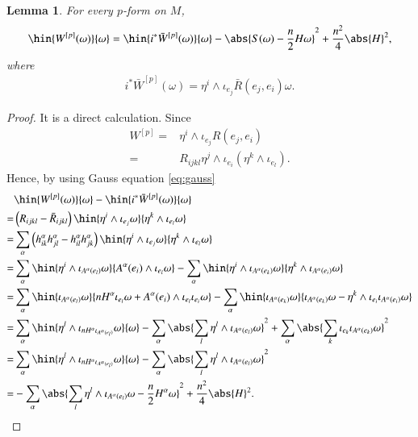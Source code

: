 \documentclass[12pt]{amsart}
\theoremstyle{plain}
\newtheorem{lem}[lem]{Lemma}
\theoremstyle{remark}
\theoremstyle{definition}
\numberwithin{equation}{section}
\begin{document}
\begin{lem}For every $p$-form on $M$,
\begin{align*}
\hin{W^{[p]}(\omega)}{\omega}=\hin{i^*\bar W^{[p]}(\omega)}{\omega}-\abs{S(\omega)-\dfrac{n}{2}H\omega}^2+\dfrac{n^2}{4}\abs{H}^2,
\end{align*}
where
\begin{align*}
i^*\bar W^{[p]}(\omega)=\eta^i\wedge\iota_{e_j}\bar R(e_j,e_i)\omega.
\end{align*}
\end{lem}
\begin{proof}It is a  direct calculation. Since
\begin{align*}
W^{[p]}=&\eta^i\wedge\iota_{e_j}R(e_j,e_i)\\
=&R_{ijkl}\eta^j\wedge\iota_{e_i}\left(\eta^k\wedge\iota_{e_l}\right).
\end{align*}
Hence, by using Gauss equation \eqref{eq:gauss}
\begin{align*}
&\hin{W^{[p]}(\omega)}{\omega}-\hin{i^*\bar W^{[p]}(\omega)}{\omega}\\
=&\left(R_{ijkl}-\bar R_{ijkl}\right)\hin{\eta^i\wedge\iota_{e_j}\omega}{\eta^k\wedge\iota_{e_l}\omega}\\
=&\sum_{\alpha}\left(h^{\alpha}_{ik}h^{\alpha}_{jl}-h^{\alpha}_{il}h^{\alpha}_{jk}\right)\hin{\eta^i\wedge\iota_{e_j}\omega}{\eta^k\wedge\iota_{e_l}\omega}\\
=&\sum_{\alpha}\hin{\eta^i\wedge\iota_{A^{\alpha}(e_l)}\omega}{A^{\alpha}(e_i)\wedge\iota_{e_l}\omega}-\sum_{\alpha}\hin{\eta^i\wedge\iota_{A^{\alpha}(e_k)}\omega}{\eta^k\wedge\iota_{A^{\alpha}(e_i)}\omega}\\
=&\sum_{\alpha}\hin{\iota_{A^{\alpha}(e_l)}\omega}{nH^{\alpha}\iota_{e_l}\omega+A^{\alpha}(e_i)\wedge\iota_{e_l}\iota_{e_i}\omega}-\sum_{\alpha}\hin{\iota_{A^{\alpha}(e_k)}\omega}{\iota_{A^{\alpha}(e_k)}\omega-\eta^k\wedge\iota_{e_i}\iota_{A^{\alpha}(e_i)}\omega}\\
=&\sum_{\alpha}\hin{\eta^l\wedge\iota_{nH^{\alpha}\iota_{A^{\alpha}(e_l)}}\omega}{\omega}-\sum_{\alpha}\abs{\sum_l\eta^l\wedge\iota_{A^{\alpha}(e_l)}\omega}^2+\sum_{\alpha}\abs{\sum_{k}\iota_{e_k}\iota_{A^{\alpha}(e_k)}\omega}^2\\
=&\sum_{\alpha}\hin{\eta^l\wedge\iota_{nH^{\alpha}\iota_{A^{\alpha}(e_l)}}\omega}{\omega}-\sum_{\alpha}\abs{\sum_l\eta^l\wedge\iota_{A^{\alpha}(e_l)}\omega}^2\\
=&-\sum_{\alpha}\abs{\sum_l\eta^l\wedge\iota_{A^{\alpha}(e_l)}\omega-\dfrac{n}{2}H^{\alpha}\omega}^2+\dfrac{n^2}{4}\abs{H}^2.
\end{align*}
\end{proof}
\end{document}
